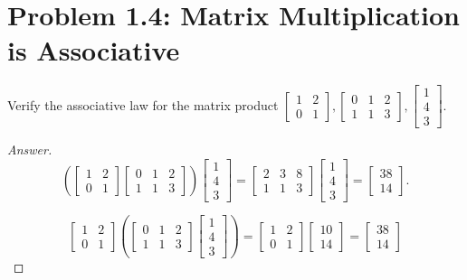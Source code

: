 \documentclass{amsbook}
\theoremstyle{definition}
\theoremstyle{remark}
\numberwithin{section}{chapter}
\numberwithin{equation}{chapter}
\begin{document}
\section{Problem 1.4: Matrix Multiplication is Associative}

Verify the associative law for the matrix product $\begin{bmatrix}
1 & 2\\
0 & 1\end{bmatrix}, \begin{bmatrix}
0 & 1 & 2\\
1 & 1 & 3 \end{bmatrix}, \begin{bmatrix}
1\\
4\\
3\end{bmatrix}$.

\begin{proof}[Answer]

\[
\left(
\begin{bmatrix}
1 & 2\\
0 & 1\end{bmatrix} \begin{bmatrix}
0 & 1 & 2\\
1 & 1 & 3 \end{bmatrix}
\right)
\begin{bmatrix}
1\\
4\\
3\end{bmatrix}
=\begin{bmatrix}
     2     &3     &8\\
     1     &1     &3
\end{bmatrix}\begin{bmatrix}
1\\
4\\
3\end{bmatrix}=\begin{bmatrix}
38\\
14\end{bmatrix}.
\]

\[
\begin{bmatrix}
1 & 2\\
0 & 1\end{bmatrix}
\left(\begin{bmatrix}
0 & 1 & 2\\
1 & 1 & 3 \end{bmatrix}
\begin{bmatrix}
1\\
4\\
3\end{bmatrix}
\right)
=\begin{bmatrix}
1 &2\\
0 &1\end{bmatrix}\begin{bmatrix}
10\\
14\end{bmatrix}=\begin{bmatrix}
38\\
14\end{bmatrix}
\]
\end{proof}
\end{document}
